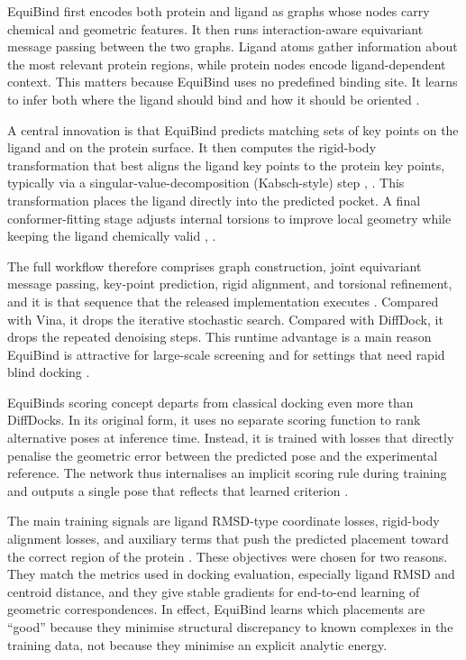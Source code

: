 EquiBind first encodes both protein and ligand as graphs whose nodes carry chemical and geometric features. It then runs interaction-aware equivariant message passing between the two graphs. Ligand atoms gather information about the most relevant protein regions, while protein nodes encode ligand-dependent context. This matters because EquiBind uses no predefined binding site. It learns to infer both where the ligand should bind and how it should be oriented \cite{ref010}.

A central innovation is that EquiBind predicts matching sets of key points on the ligand and on the protein surface. It then computes the rigid-body transformation that best aligns the ligand key points to the protein key points, typically via a singular-value-decomposition (Kabsch-style) step \cite{ref010}, \cite{ref062}. This transformation places the ligand directly into the predicted pocket. A final conformer-fitting stage adjusts internal torsions to improve local geometry while keeping the ligand chemically valid \cite{ref009}, \cite{ref010}.

The full workflow therefore comprises graph construction, joint equivariant message passing, key-point prediction, rigid alignment, and torsional refinement, and it is that sequence that the released implementation executes \cite{ref009}. Compared with Vina, it drops the iterative stochastic search. Compared with DiffDock, it drops the repeated denoising steps. This runtime advantage is a main reason EquiBind is attractive for large-scale screening and for settings that need rapid blind docking \cite{ref010}.

EquiBind\textquotesingle s scoring concept departs from classical docking even more than DiffDock\textquotesingle s. In its original form, it uses no separate scoring function to rank alternative poses at inference time. Instead, it is trained with losses that directly penalise the geometric error between the predicted pose and the experimental reference. The network thus internalises an implicit scoring rule during training and outputs a single pose that reflects that learned criterion \cite{ref010}.

The main training signals are ligand RMSD-type coordinate losses, rigid-body alignment losses, and auxiliary terms that push the predicted placement toward the correct region of the protein \cite{ref010}. These objectives were chosen for two reasons. They match the metrics used in docking evaluation, especially ligand RMSD and centroid distance, and they give stable gradients for end-to-end learning of geometric correspondences. In effect, EquiBind learns which placements are ``good'' because they minimise structural discrepancy to known complexes in the training data, not because they minimise an explicit analytic energy.

